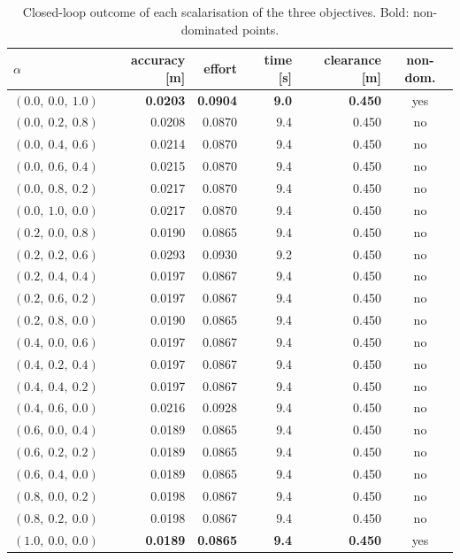 \begin{table}[htbp]
  \centering
  \small
  \caption{Closed-loop outcome of each scalarisation of the three objectives. Bold: non-dominated points.}
  \label{res:tab:pareto}
  \begin{tabular}{lrrrrc}
    \toprule
    $\alpha$ & accuracy [m] & effort & time [s] & clearance [m] & non-dom. \\
    \midrule
    $(0.0,\ 0.0,\ 1.0)$ & \textbf{0.0203} & \textbf{0.0904} & \textbf{9.0} & \textbf{0.450} & yes \\
    $(0.0,\ 0.2,\ 0.8)$ & 0.0208 & 0.0870 & 9.4 & 0.450 & no \\
    $(0.0,\ 0.4,\ 0.6)$ & 0.0214 & 0.0870 & 9.4 & 0.450 & no \\
    $(0.0,\ 0.6,\ 0.4)$ & 0.0215 & 0.0870 & 9.4 & 0.450 & no \\
    $(0.0,\ 0.8,\ 0.2)$ & 0.0217 & 0.0870 & 9.4 & 0.450 & no \\
    $(0.0,\ 1.0,\ 0.0)$ & 0.0217 & 0.0870 & 9.4 & 0.450 & no \\
    $(0.2,\ 0.0,\ 0.8)$ & 0.0190 & 0.0865 & 9.4 & 0.450 & no \\
    $(0.2,\ 0.2,\ 0.6)$ & 0.0293 & 0.0930 & 9.2 & 0.450 & no \\
    $(0.2,\ 0.4,\ 0.4)$ & 0.0197 & 0.0867 & 9.4 & 0.450 & no \\
    $(0.2,\ 0.6,\ 0.2)$ & 0.0197 & 0.0867 & 9.4 & 0.450 & no \\
    $(0.2,\ 0.8,\ 0.0)$ & 0.0190 & 0.0865 & 9.4 & 0.450 & no \\
    $(0.4,\ 0.0,\ 0.6)$ & 0.0197 & 0.0867 & 9.4 & 0.450 & no \\
    $(0.4,\ 0.2,\ 0.4)$ & 0.0197 & 0.0867 & 9.4 & 0.450 & no \\
    $(0.4,\ 0.4,\ 0.2)$ & 0.0197 & 0.0867 & 9.4 & 0.450 & no \\
    $(0.4,\ 0.6,\ 0.0)$ & 0.0216 & 0.0928 & 9.4 & 0.450 & no \\
    $(0.6,\ 0.0,\ 0.4)$ & 0.0189 & 0.0865 & 9.4 & 0.450 & no \\
    $(0.6,\ 0.2,\ 0.2)$ & 0.0189 & 0.0865 & 9.4 & 0.450 & no \\
    $(0.6,\ 0.4,\ 0.0)$ & 0.0189 & 0.0865 & 9.4 & 0.450 & no \\
    $(0.8,\ 0.0,\ 0.2)$ & 0.0198 & 0.0867 & 9.4 & 0.450 & no \\
    $(0.8,\ 0.2,\ 0.0)$ & 0.0198 & 0.0867 & 9.4 & 0.450 & no \\
    $(1.0,\ 0.0,\ 0.0)$ & \textbf{0.0189} & \textbf{0.0865} & \textbf{9.4} & \textbf{0.450} & yes \\
    \bottomrule
  \end{tabular}
\end{table}

